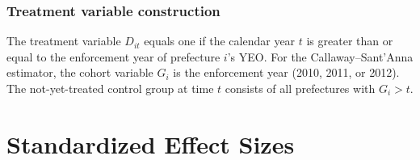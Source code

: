 \documentclass[12pt]{article}
\begin{document}
\subsubsection*{Treatment variable construction} The treatment variable $D_{it}$ equals one if the calendar year $t$ is greater than or equal to the enforcement year of prefecture $i$'s YEO. For the Callaway--Sant'Anna estimator, the cohort variable $G_i$ is the enforcement year (2010, 2011, or 2012). The not-yet-treated control group at time $t$ consists of all prefectures with $G_i > t$.

\section{Standardized Effect Sizes}
\label{sec:sde}


\end{document}
